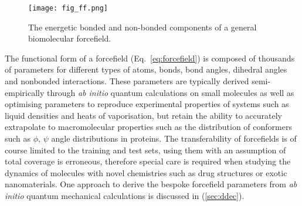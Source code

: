 %
\begin{figure}[H]
    \centering
    \texttt{[image: fig\_ff.png]}
    \caption{The energetic bonded and non-bonded components of a general biomolecular forcefield.}
    \label{fig_ff}
\end{figure}
%
The functional form of a forcefield (Eq.~\ref{eq:forcefield}) is composed of thousands of parameters for different types of atoms, bonds, bond angles, dihedral angles and nonbonded interactions.\cite{harder2016opls3} These parameters are typically derived semi-empirically through \textit{ab initio} quantum calculations on small molecules as well as optimising parameters to reproduce experimental properties of systems such as liquid densities and heats of vaporisation,\cite{vanommeslaeghe2010charmm} but retain the ability to accurately extrapolate to macromolecular properties such as the distribution of conformers such as $\phi,\, \psi$ angle distributions in proteins.\cite{mackerell2004improved} The transferability of forcefields is of course limited to the training and test sets, using them with an assumption of total coverage is erroneous, therefore special care is required when studying the dynamics of molecules with novel chemistries such as drug structures or exotic nanomaterials.\cite{harder2016opls3} One approach to derive the bespoke forcefield parameters from \textit{ab initio} quantum mechanical calculations is discussed in (\ref{sec:ddec}).
%
